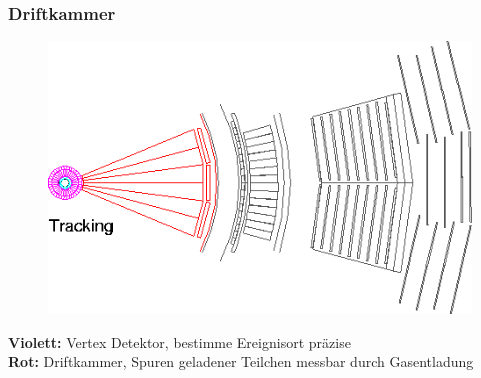 \begin{frame}
	\frametitle{Driftkammer}
	\begin{center}
		\begin{figure}
			\includegraphics[width=0.75\linewidth]{graphics/slice_tracking_tr}
		\end{figure}
	\end{center}
	\textbf{Violett:} Vertex Detektor, bestimme Ereignisort präzise\\
	\textbf{Rot:} Driftkammer, Spuren geladener Teilchen messbar durch Gasentladung
\end{frame}

